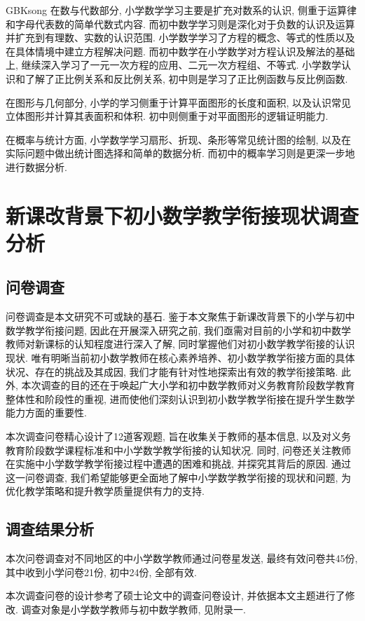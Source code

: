 \documentclass[a4paper,12pt,twoside]{ctexart}
\begin{document}
\begin{CJK*}{GBK}{song}
在数与代数部分, 小学数学学习主要是扩充对数系的认识, 侧重于运算律和字母代表数的简单代数式内容. 而初中数学学习则是深化对于负数的认识及运算并扩充到有理数、实数的认识范围. 小学数学学习了方程的概念、等式的性质以及在具体情境中建立方程解决问题. 而初中数学在小学数学对方程认识及解法的基础上, 继续深入学习了一元一次方程的应用、二元一次方程组、不等式. 小学数学认识和了解了正比例关系和反比例关系, 初中则是学习了正比例函数与反比例函数.

在图形与几何部分, 小学的学习侧重于计算平面图形的长度和面积, 以及认识常见立体图形并计算其表面积和体积. 初中则侧重于对平面图形的逻辑证明能力.

在概率与统计方面, 小学数学学习扇形、折现、条形等常见统计图的绘制, 以及在实际问题中做出统计图选择和简单的数据分析. 而初中的概率学习则是更深一步地进行数据分析.

\section{新课改背景下初小数学教学衔接现状调查分析}

\subsection{问卷调查}

问卷调查是本文研究不可或缺的基石. 鉴于本文聚焦于新课改背景下的小学与初中数学教学衔接问题, 因此在开展深入研究之前, 我们亟需对目前的小学和初中数学教师对新课标的认知程度进行深入了解, 同时掌握他们对初小数学教学衔接的认识现状. 唯有明晰当前初小数学教师在核心素养培养、初小数学教学衔接方面的具体状况、存在的挑战及其成因, 我们才能有针对性地探索出有效的教学衔接策略. 此外, 本次调查的目的还在于唤起广大小学和初中数学教师对义务教育阶段数学教育整体性和阶段性的重视, 进而使他们深刻认识到初小数学教学衔接在提升学生数学能力方面的重要性.

本次调查问卷精心设计了12道客观题, 旨在收集关于教师的基本信息, 以及对义务教育阶段数学课程标准和中小学数学教学衔接的认知状况. 同时, 问卷还关注教师在实施中小学数学教学衔接过程中遭遇的困难和挑战, 并探究其背后的原因. 通过这一问卷调查, 我们希望能够更全面地了解中小学数学教学衔接的现状和问题, 为优化教学策略和提升教学质量提供有力的支持.
\subsection{调查结果分析}

本次问卷调查对不同地区的中小学数学教师通过问卷星发送, 最终有效问卷共45份, 其中收到小学问卷21份, 初中24份, 全部有效.

本次调查问卷的设计参考了硕士论文\cite{guo}中的调查问卷设计, 并依据本文主题进行了修改. 调查对象是小学数学教师与初中数学教师, 见附录一.


\end{CJK*}
\end{document}
